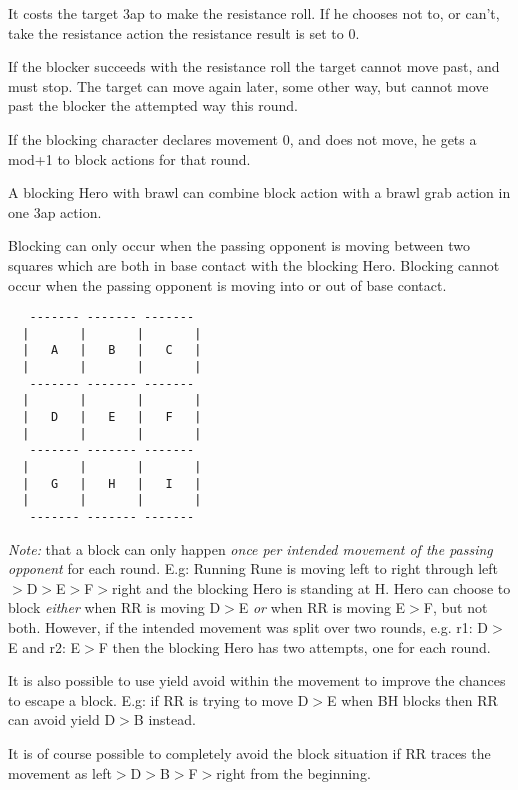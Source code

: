 It costs the target 3ap to make the resistance roll. If he chooses not to, or can't, take the resistance action the resistance result is set to 0.

If the blocker succeeds with the resistance roll the target cannot move past, and must stop. The target can move again later, some other way, but cannot move past the blocker the attempted way this round.

If the blocking character declares movement 0, and does not move, he gets a mod+1 to block actions for that round.

A blocking Hero with brawl can combine block action with a brawl grab action in one 3ap action.

Blocking can only occur when the passing opponent is moving between two squares which are both in base contact with the blocking Hero. Blocking cannot occur when the passing opponent is moving into or out of base contact.

\begin{samepage} \goodbreak
\scriptsize \begin{verbatim}
   ------- ------- -------
  |       |       |       |
  |   A   |   B   |   C   |
  |       |       |       |
   ------- ------- -------
  |       |       |       |
  |   D   |   E   |   F   |
  |       |       |       |
   ------- ------- -------
  |       |       |       |
  |   G   |   H   |   I   |
  |       |       |       |
   ------- ------- -------
\end{verbatim} \normalsize
\end{samepage}

\emph{Note:} that a block can only happen \emph{once per intended movement of the passing opponent} for each round. E.g: Running Rune is moving left to right through left$>$D$>$E$>$F$>$right and the blocking Hero is standing at H. Hero can choose to block \emph{either} when RR is moving D$>$E \emph{or} when RR is moving E$>$F, but not both. However, if the intended movement was split over two rounds, e.g. r1: D$>$E and r2: E$>$F then the blocking Hero has two attempts, one for each round.

It is also possible to use yield avoid within the movement to improve the chances to escape a block. E.g: if RR is trying to move D$>$E when BH blocks then RR can avoid yield D$>$B instead.

It is of course possible to completely avoid the block situation if RR traces the movement as left$>$D$>$B$>$F$>$right from the beginning.

